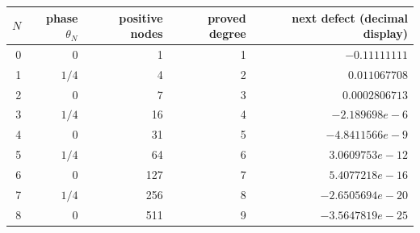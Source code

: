 \begin{tabular}{@{}rrrrr@{}}
\toprule
$N$ & phase $\theta_N$ & positive nodes & proved degree & next defect (decimal display)\\
\midrule
0 & $0$ & 1 & 1 & $-0.11111111$\\
1 & $1/4$ & 4 & 2 & $0.011067708$\\
2 & $0$ & 7 & 3 & $0.0002806713$\\
3 & $1/4$ & 16 & 4 & $-2.189698e-6$\\
4 & $0$ & 31 & 5 & $-4.8411566e-9$\\
5 & $1/4$ & 64 & 6 & $3.0609753e-12$\\
6 & $0$ & 127 & 7 & $5.4077218e-16$\\
7 & $1/4$ & 256 & 8 & $-2.6505694e-20$\\
8 & $0$ & 511 & 9 & $-3.5647819e-25$\\
\bottomrule
\end{tabular}
